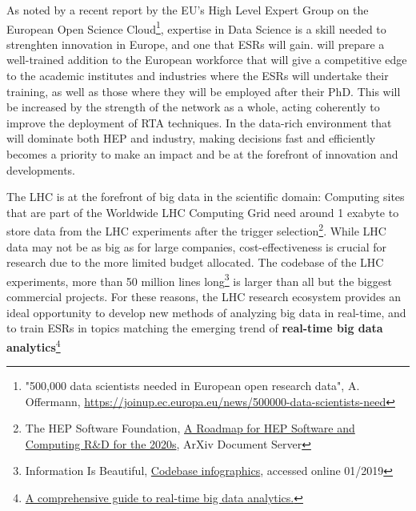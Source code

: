 As noted by a recent report by the EU's High Level Expert Group on the European Open Science Cloud\footnote{"500,000 data scientists needed in European open research data",
A. Offermann, \url{https://joinup.ec.europa.eu/news/500000-data-scientists-need}}, expertise in Data Science is a skill needed to strenghten innovation in Europe, 
and one that \acronym ESRs will gain. 
\acronym will prepare a well-trained addition to the European workforce that will give a competitive edge to the academic institutes and industries where the ESRs will undertake their training, as well as those where they will be employed after their PhD.  
This will be increased by the strength of the network as a whole, acting coherently to improve the deployment of RTA techniques. 
In the data-rich environment that will dominate both HEP and industry, making decisions fast and efficiently becomes a priority to make an impact and
be at the forefront of innovation and developments.  

The LHC is at the forefront of big data in the scientific domain: Computing sites that are part of the Worldwide LHC Computing Grid need around 1 exabyte to store data from the LHC experiments after the trigger selection\footnote{The HEP Software Foundation, \href{https://arxiv.org/pdf/1712.06982.pdf}{A Roadmap for HEP Software and Computing R\&D for the 2020s}, ArXiv Document Server}. 
While LHC data may not be as big as for large companies, cost-effectiveness is crucial for research due to the more limited budget allocated. 
The codebase of the LHC experiments, more than 50 million lines long\footnote{Information Is Beautiful, \href{http://www.informationisbeautiful.net/visualizations/million-lines-of-code/}{Codebase infographics}, accessed online 01/2019} is larger than all but the biggest commercial projects.  
For these reasons, the LHC research ecosystem provides an ideal opportunity to develop new methods of analyzing big data in real-time, and to train ESRs in topics matching the emerging trend of \textbf{real-time big data analytics}\footnote{\href{https://www.scnsoft.com/blog/real-time-big-data-analytics-comprehensive-guide}{A comprehensive guide to real-time big data analytics.}} 



 
